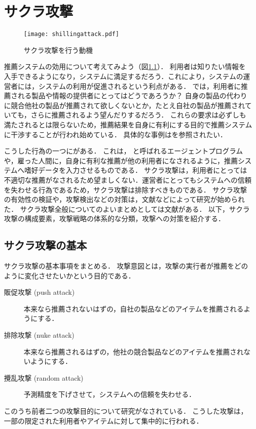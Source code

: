 \chapter{サクラ攻撃}
\label{chap:shilling}

\begin{figure}
\centering
\texttt{[image: shillingattack.pdf]}
\caption{サクラ攻撃を行う動機}
\label{fig:shilling-motivation}
\end{figure}

推薦システムの効用について考えてみよう（図\ref{fig:shilling-motivation}）．
利用者は知りたい情報を入手できるようになり，システムに満足するだろう．これにより，システムの運営者には，システムの利用が促進されるという利点がある．
では，利用者に推薦される製品や情報の提供者にとってはどうであろうか？
自身の製品の代わりに競合他社の製品が推薦されて欲しくないとか，たとえ自社の製品が推薦されていても，さらに推薦されるよう望んだりするだろう．
これらの要求は必ずしも満たされるとは限らないため，推薦結果を自身に有利にする目的で推薦システムに干渉することが行われ始めている．
具体的な事例は\cite{www:04:01}を参照されたい．

こうした行為の一つにがある．
これは， と呼ばれるエージェントプログラムや，雇った人間に，自身に有利な推薦が他の利用者になされるように，推薦システムへ嗜好データを入力させるものである．
サクラ攻撃は，利用者にとっては不適切な推薦がなされるため望ましくない．運営者にとってもシステムへの信頼を失わせる行為であるため，サクラ攻撃は排除すべきものである．
サクラ攻撃の有効性の検証や，攻撃検出などの対策は，文献\cite{jacm:04:02,www:04:01}などによって研究が始められた．
サクラ攻撃全般についてのよいまとめとしては文献\cite{ieeem:07:07}がある．
以下，サクラ攻撃の構成要素，攻撃戦略の体系的な分類，攻撃への対策を紹介する．

\section{サクラ攻撃の基本}
\label{sec:shilling:basics}

サクラ攻撃の基本事項をまとめる．
攻撃意図とは，攻撃の実行者が推薦をどのように変化させたいかという目的である．
\begin{description}
 \item[販促攻撃 (push attack)] 本来なら推薦されないはずの，自社の製品などのアイテムを推薦されるようにする．
 \item[排除攻撃 (nuke attack)] 本来なら推薦されるはずの，他社の競合製品などのアイテムを推薦されないようにする．
 \item[攪乱攻撃 (random attack)] 予測精度を下げさせて，システムへの信頼を失わせる．
\end{description}
このうち前者二つの攻撃目的について研究がなされている．
こうした攻撃は，一部の限定された利用者やアイテムに対して集中的に行われる．

